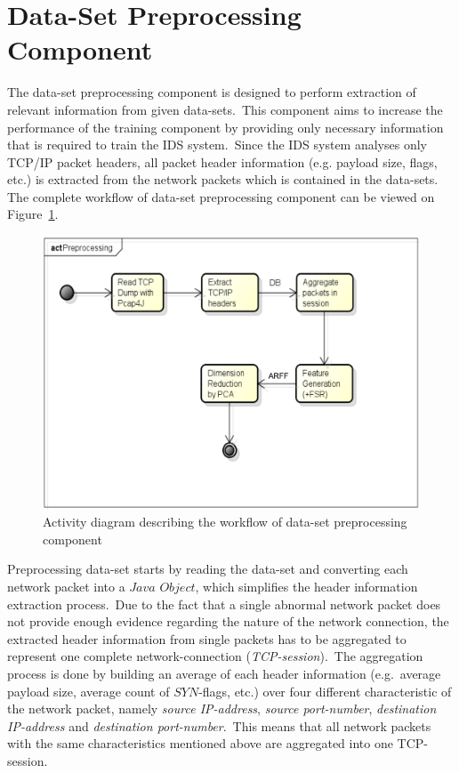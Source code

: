 	\section{Data-Set Preprocessing Component}

		The data-set preprocessing component is designed to perform extraction of relevant information from given data-sets.\ This component aims to increase the performance of the training component by providing only necessary information that is required to train the IDS system.\ Since the IDS system analyses only TCP/IP packet headers, all packet header information (e.g. payload size, flags, etc.) is extracted from the network packets which is contained in the data-sets. The complete workflow of data-set preprocessing component can be viewed on Figure~\ref{fig:activityDiagramPreprocessing}.

		\begin{figure}[hb]
	 	 \centering
		  \includegraphics[scale=0.2668]{figures/ActivityDiagramPreprocessing.png}
		  \caption{Activity diagram describing the workflow of data-set preprocessing component}
		  \label{fig:activityDiagramPreprocessing}
		\end{figure}
		
		Preprocessing data-set starts by reading the data-set and converting each network packet into a $Java$ $Object$, which simplifies the header information extraction process.\ Due to the fact that a single abnormal network packet does not provide enough evidence regarding the nature of the network connection, the extracted header information from single packets has to be aggregated to represent one complete network-connection (\textit{TCP-session}).\ The aggregation process is done by building an average of each header information (e.g.\ average payload size, average count of $SYN$-flags, etc.) over four different characteristic of the network packet, namely \textit{source IP-address}, \textit{source port-number}, \textit{destination IP-address} and \textit{destination port-number}.\ This means that all network packets with the same characteristics mentioned above are aggregated into one TCP-session.
		
